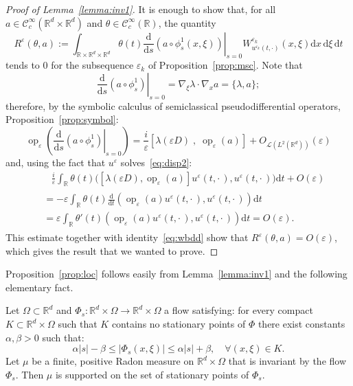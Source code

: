\documentclass[AHL,Unicode,longabstracts]{cedram}
\DeclareMathOperator{\op}{op}
\newcommand*\R{{\mathbb R}}
\newcommand*\eps{\varepsilon}
\newcommand{\To}{\longrightarrow}
\numberwithin{equation}{section}
\let\oldforall\forall
\renewcommand*{\forall}{\mathrel{\oldforall}}
\newcommand*{\dd}{\mathrm{d}}
\newcommand*{\dt}{\dd t}
\newcommand*{\ds}{\dd s}
\newcommand*{\dx}{\dd x}
\newcommand*{\dxi}{\dd \xi}
\begin{document}
\begin{proof}[Proof of Lemma~\ref{lemma:inv1}]
It is enough to show that, for all $a\in{\mathcal C}_c^\infty(\R^d\times\R^d)$ and $\theta\in{\mathcal C}_c^\infty(\R)$, the quantity
\[
R^\eps(\theta,a):=\int_{\R\times\R^d\times\R^d} \theta(t) \left.\frac{\dd}{\ds}(a\circ\phi^1_s(x,\xi))\right|_{s=0}W_{u^{\eps_k}(t,\cdot)}^{\eps_k}(x,\xi)\dx\,\dxi\, \dt
\]
tends to $0$ for the subsequence $\eps_k$ of Proposition~\ref{prop:msc}.
Note that
\[
\left.\frac{\dd}{\ds}(a\circ\phi^1_s)\right|_{s=0}=\nabla_\xi\lambda\cdot\nabla_x a=\{\lambda,a\};
\]
therefore, by the symbolic calculus of semiclassical pseudodifferential operators, Proposition~\ref{prop:symbol}:
\[
\op_\eps\left(\left.\frac{\dd}{\ds}(a\circ\phi^1_s)\right|_{s=0}\right) = \frac{i}{\eps} \left[\lambda(\eps D)\;,\;\op_\eps(a)\right]+O_{{\mathcal L}\left(L^2(\R^d)\right)}(\eps)
\]
and, using the fact that $u^\eps$ solves~\eqref{eq:disp2}:
\begin{multline*}
\qquad \frac{i}{\eps}\int_\R\theta(t) \big(\left[\lambda(\eps D),\op_\eps(a)\right] u^\eps(t,\cdot\,),u^\eps(t,\cdot\,)\big) \dt+O(\eps)
\\
\begin{aligned}
&= -\eps \int_\R \theta(t) \frac{\dd}{\dt} \left(\op_\eps(a) u^\eps(t,\cdot\,),u^\eps(t,\cdot\,)\right) \dt\\
&= \eps \int_\R \theta'(t)\left(\op_\eps(a) u^\eps(t,\cdot\,),u^\eps(t,\cdot\,)\right) \dt
= O(\eps).
\end{aligned}
\end{multline*}
This estimate together with identity~\eqref{eq:wbdd} show that $R^\eps(\theta,a)=O(\eps)$, which gives the result that we wanted to prove.
\end{proof}

Proposition~\ref{prop:loc} follows easily from Lemma~\ref{lemma:inv1} and the following elementary fact.

\begin{lemm}\label{lem:classicdisp}
Let $\Omega\subset\R^d$ and $\Phi_s:\R^d\times\Omega\To\R^d\times\Omega$ a flow satisfying: for every compact $K\subset\R^d\times\Omega$ such that $K$ contains no stationary points of $\Phi$ there exist constants $\alpha,\beta>0$ such that:
\[
\alpha |s| - \beta \leqslant |\Phi_s(x,\xi)| \leqslant \alpha|s|+\beta,\quad\forall(x,\xi)\in K.
\]
Let $\mu$ be a finite, positive Radon measure on $\R^d\times\Omega$ that is invariant by the flow $\Phi_s$. Then $\mu$ is supported on the set of stationary points of $\Phi_s$.
\end{lemm}
\end{document}
